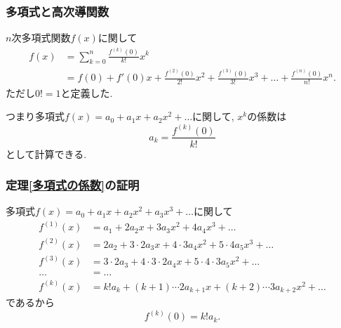 




\begin{frame}
\frametitle{多項式と高次導関数}


\begin{Thm} \label{多項式の係数}
$n$次多項式関数$f(x)$に関して
\begin{align*}
f(x) & = \sum_{k=0}^n\frac{f^{(k)}(0)}{k!}x^k \\
& =  f(0)+ f'(0)x + \frac{f^{(2)}(0)}{2!}x^2 +  \frac{f^{(3)}(0)}{3!}x^3+ \dots + \frac{f^{(n)}(0)}{n!}x^n. 
\end{align*}
ただし$0!=1$と定義した. 
\end{Thm}
つまり多項式$f(x)=a_0+a_1x+a_2x^2+\dots$に関して, $x^k$の係数は
$$
a_k=\frac{f^{(k)}(0)}{k!} 
$$
として計算できる. 

\end{frame}








\begin{frame}
\frametitle{定理\ref{多項式の係数}の証明}


多項式$f(x)=a_0+a_1x+a_2x^2+a_3x^3+\dots$に関して
\begin{align*}
f^{(1)}(x) &=a_1+2a_2x+3a_3x^2+4a_4x^3+\dots \\
f^{(2)}(x) &=2a_2+3\cdot 2 a_3x+4\cdot 3 a_4x^2+5\cdot 4 a_5 x^3+\dots \\
f^{(3)}(x) &=3\cdot 2 a_3+4\cdot 3 \cdot 2 a_4x+5\cdot 4 \cdot 3 a_5 x^2+\dots \\
\dots & = \dots \\ 
f^{(k)}(x) &= k! a_k +(k+1)\cdots 2a_{k+1}x+(k+2)\cdots 3a_{k+2}x^2+\dots
\end{align*}
であるから
$$
f^{(k)}(0)=k! a_k.  
$$

\end{frame}








